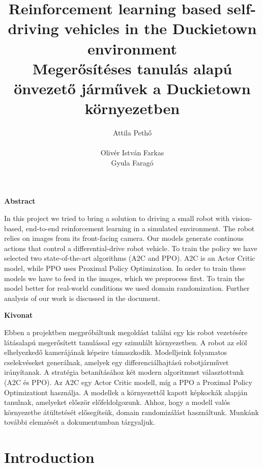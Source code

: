 \documentclass{article}
\title{Reinforcement learning based self-driving vehicles in the Duckietown environment\\
	\large Megerősítéses tanulás alapú önvezető járművek a Duckietown környezetben}
\author{
  Attila Pethő\\\\
   \And  
   Olivér István Farkas\\
   \And
    Gyula Faragó\\
}
\begin{document}

\maketitle



\begin{center}
	\large
	\textbf{Abstract}\\
\end{center}
In this project we tried to bring a solution to driving a small robot with vision-based, end-to-end reinforcement learning in a simulated environment. The robot relies on images from its front-facing camera. Our models generate continous actions that control a differential-drive robot vehicle. To train the policy we have selected two state-of-the-art algorithms (A2C and PPO). A2C is an Actor Critic model, while PPO uses Proximal Policy Optimization. 
In order to train these models we have to feed in the images, which we preprocess first. To train the model better for real-world conditions we used domain randomization. Further analysis of our work is discussed in the document.

\begin{center}
	\large
	\textbf{Kivonat}\\
\end{center}

Ebben a projektben megpróbáltunk megoldást találni egy kis robot vezetésére látásalapú megerősített tanulással egy szimulált környezetben. A robot az elöl elhelyezkedő kamerájának képeire támaszkodik. Modelljeink folyamatos cselekvéseket generálnak, amelyek egy differenciálhajtású robotjárművet irányítanak. A stratégia betanításához két modern algoritmust választottunk (A2C és PPO). 
Az A2C egy Actor Critic modell, míg a PPO a Proximal Policy Optimizationt használja. A modellek a környezettől kapott képkockák alapján tanulnak, amelyeket először előfeldolgozunk. Ahhoz, hogy a modell valós környezetbe átültetését elősegítsük, domain randomizálást használtunk. Munkánk további elemzését a dokumentumban tárgyaljuk.

\section{\large{Introduction}}
\end{document}

